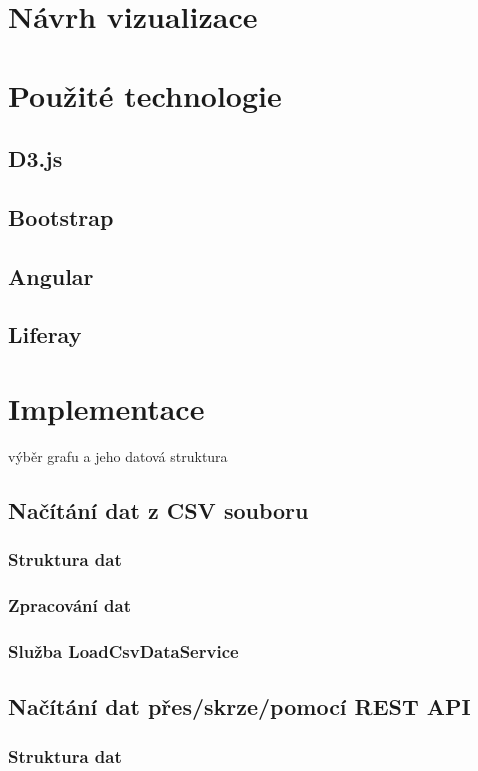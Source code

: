\documentclass[
  digital, %
  oneside, %
  table,   %
  nolof,     %
  nolot,     %
]{fithesis3}
\begin{document}
\chapter{Návrh vizualizace}

\chapter{Použité technologie}
\section{D3.js}
\section{Bootstrap}
\section{Angular}
\section{Liferay}

\chapter{Implementace}
výběr grafu a jeho datová struktura

\section{Načítání dat z CSV souboru}
\subsection{Struktura dat}
\subsection{Zpracování dat}
\subsection{Služba LoadCsvDataService}

\section{Načítání dat přes/skrze/pomocí REST API}
\subsection{Struktura dat}
\end{document}
